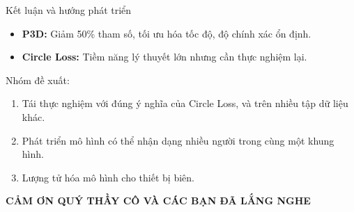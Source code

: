 \begin{frame}{Kết luận và hướng phát triển}
    \begin{itemize}
        \item \textbf{P3D:} Giảm 50\% tham số, tối ưu hóa tốc độ, độ chính xác ổn định.
        \item \textbf{Circle Loss:} Tiềm năng lý thuyết lớn nhưng cần thực nghiệm lại.
    \end{itemize}
\vspace{0.5cm}
Nhóm đề xuất:
    \begin{enumerate}
        \item Tái thực nghiệm với đúng ý nghĩa của Circle Loss, và trên nhiều tập dữ liệu khác.
        \item Phát triển mô hình có thể nhận dạng nhiều người trong cùng một khung hình.
        \item Lượng tử hóa mô hình cho thiết bị biên.
    \end{enumerate}
\end{frame}

\begin{frame}[plain]
    \centering
    \Huge \textbf{CẢM ƠN QUÝ THẦY CÔ VÀ CÁC BẠN ĐÃ LẮNG NGHE}
\end{frame}